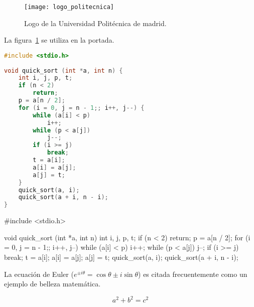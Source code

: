 \begin{figure}[htp!]
  \centering
  \texttt{[image: logo\_politecnica]}
  \caption{Logo de la Universidad Politécnica de madrid.}
  \label{fig:logo_uam}
\end{figure} 

La figura~\ref{fig:logo_uam} se utiliza en la portada.

\clearpage

\begin{lstlisting}[label=algoritmo:quicksort,language=C,frame=single,caption=Algoritmo de ordenación Quicksort]
#include <stdio.h>
 
void quick_sort (int *a, int n) {
    int i, j, p, t;
    if (n < 2)
        return;
    p = a[n / 2];
    for (i = 0, j = n - 1;; i++, j--) {
        while (a[i] < p)
            i++;
        while (p < a[j])
            j--;
        if (i >= j)
            break;
        t = a[i];
        a[i] = a[j];
        a[j] = t;
    }
    quick_sort(a, i);
    quick_sort(a + i, n - i);
}
\end{lstlisting}

\begin{code}
#include <stdio.h>
 
void quick_sort (int *a, int n) {
    int i, j, p, t;
    if (n < 2)
        return;
    p = a[n / 2];
    for (i = 0, j = n - 1;; i++, j--) {
        while (a[i] < p)
            i++;
        while (p < a[j])
            j--;
        if (i >= j)
            break;
        t = a[i];
        a[i] = a[j];
        a[j] = t;
    }
    quick_sort(a, i);
    quick_sort(a + i, n - i);
}
\end{code}

La ecuación de Euler ($e^{ \pm i\theta } = \cos \theta \pm i\sin \theta$) es citada frecuentemente como un ejemplo de belleza matemática.

\begin{equation}\label{eq:pythagoras}
a^2 + b^2 = c^2
\end{equation}


